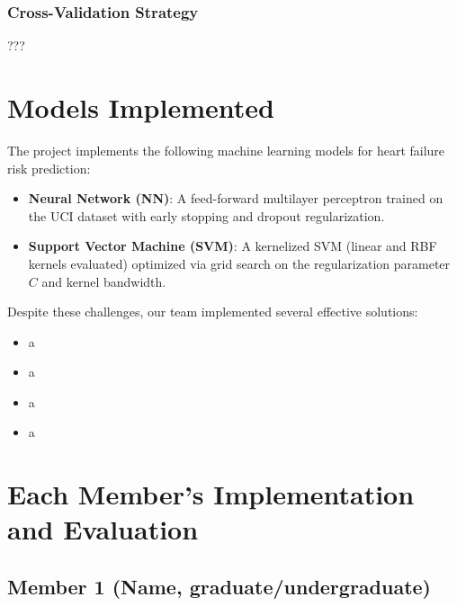 \documentclass[11pt,a4paper]{article}
\begin{document}
\subsubsection{Cross-Validation Strategy}
\vspace{-0.25cm}
???

\section{Models Implemented}
The project implements the following machine learning models for heart
failure risk prediction:
\begin{itemize}
    \vspace{-0.25cm}
    \item \textbf{Neural Network (NN)}: A feed-forward multilayer perceptron trained on the UCI dataset with early stopping and dropout regularization.
    \item \textbf{Support Vector Machine (SVM)}: A kernelized SVM (linear and RBF kernels evaluated) optimized via grid search on the regularization parameter $C$ and kernel bandwidth.
\end{itemize}


\begin{tcolorbox}[infobox={Insights and Solutions}]
    Despite these challenges, our team implemented several effective solutions:
    \vspace{-0.25cm}
    \begin{itemize}
        \item a
        \item a
        \item a
        \item a
    \end{itemize}
\end{tcolorbox}

\section{Each Member's Implementation and Evaluation}

\subsection{Member 1 (Name, graduate/undergraduate)}
\end{document}

